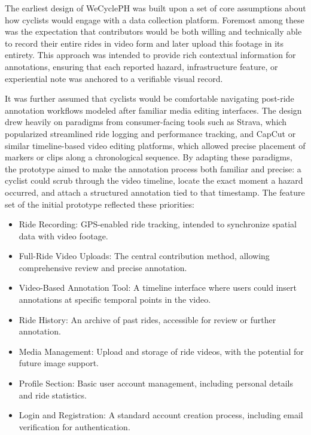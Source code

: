 The earliest design of WeCyclePH was built upon a set of core assumptions about how cyclists would engage with a data collection platform. Foremost among these was the expectation that contributors would be both willing and technically able to record their entire rides in video form and later upload this footage in its entirety. This approach was intended to provide rich contextual information for annotations, ensuring that each reported hazard, infrastructure feature, or experiential note was anchored to a verifiable visual record.

It was further assumed that cyclists would be comfortable navigating post-ride annotation workflows modeled after familiar media editing interfaces. The design drew heavily on paradigms from consumer-facing tools such as Strava, which popularized streamlined ride logging and performance tracking, and CapCut or similar timeline-based video editing platforms, which allowed precise placement of markers or clips along a chronological sequence. By adapting these paradigms, the prototype aimed to make the annotation process both familiar and precise: a cyclist could scrub through the video timeline, locate the exact moment a hazard occurred, and attach a structured annotation tied to that timestamp.
The feature set of the initial prototype reflected these priorities:

\begin{itemize}
    \item Ride Recording: GPS-enabled ride tracking, intended to synchronize spatial data with video footage.
    \item Full-Ride Video Uploads: The central contribution method, allowing comprehensive review and precise annotation.
    \item Video-Based Annotation Tool: A timeline interface where users could insert annotations at specific temporal points in the video.
    \item Ride History: An archive of past rides, accessible for review or further annotation.
    \item Media Management: Upload and storage of ride videos, with the potential for future image support.
    \item Profile Section: Basic user account management, including personal details and ride statistics.
    \item Login and Registration: A standard account creation process, including email verification for authentication.
\end{itemize}



